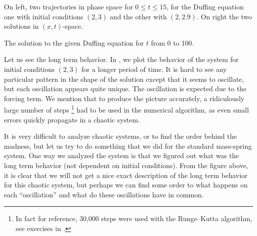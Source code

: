 \documentclass{ximera}
\begin{document}
\begin{myfig}
    \capstart
    \caption{On left, two trajectories in phase space for $0 \leq t \leq 15$, for the Duffing equation one with initial conditions $(2,3)$ and the other with $(2,2.9)$.  On right the two solutions in $(x,t)$-space. \label{nlin:duf-two-traj}}
\end{myfig}

\begin{myfig}
    \capstart
    \caption{The solution to the given Duffing equation for $t$ from 0 to 100.
    \label{nlin:duf-long}}
\end{myfig}


Let us see the long term behavior. In , we plot the behavior of the system for initial conditions $(2,3)$ for a longer period of time. It is hard to see any particular pattern in the shape of the solution except that it seems to oscillate, but each oscillation appears quite unique.  The oscillation is expected due to the forcing term. We mention that to produce the picture accurately, a ridiculously large number of steps
\footnote{In fact for reference, 30,000 steps were used with the Runge--Kutta algorithm, see exercises in .} 
had to be used in the numerical algorithm, as even small errors quickly propagate in a chaotic system. 


It is very difficult to analyze chaotic systems, or to find the order behind the madness, but let us try to do something that we did for the standard mass-spring system.  One way we analyzed the system is that we figured out what was the long term behavior (not dependent on initial conditions).  From the figure above, it is clear that we will not get a nice exact description of the long term behavior for this chaotic system, but perhaps we can find some order to what happens on each ``oscillation'' and what do these oscillations have in common.
\end{document}
